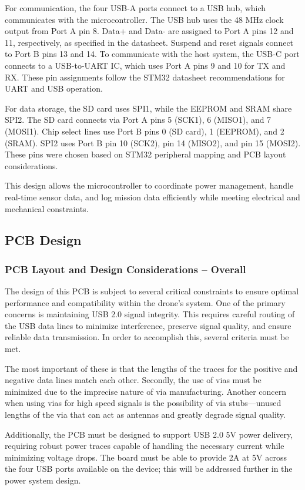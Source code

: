 \documentclass[12pt]{article}
\begin{document}
For communication, the four USB-A ports connect to a USB hub, which communicates with the microcontroller. The USB hub uses the 48 MHz clock output from Port A pin 8. Data+ and Data- are assigned to Port A pins 12 and 11, respectively, as specified in the datasheet. Suspend and reset signals connect to Port B pins 13 and 14. To communicate with the host system, the USB-C port connects to a USB-to-UART IC, which uses Port A pins 9 and 10 for TX and RX. These pin assignments follow the STM32 datasheet recommendations for UART and USB operation.

For data storage, the SD card uses SPI1, while the EEPROM and SRAM share SPI2. The SD card connects via Port A pins 5 (SCK1), 6 (MISO1), and 7 (MOSI1). Chip select lines use Port B pins 0 (SD card), 1 (EEPROM), and 2 (SRAM). SPI2 uses Port B pin 10 (SCK2), pin 14 (MISO2), and pin 15 (MOSI2). These pins were chosen based on STM32 peripheral mapping and PCB layout considerations.

This design allows the microcontroller to coordinate power management, handle real-time sensor data, and log mission data efficiently while meeting electrical and mechanical constraints.
\subsection{PCB Design}
\subsubsection{PCB Layout and Design Considerations – Overall}
The design of this PCB is subject to several critical constraints to ensure optimal performance and compatibility within the drone’s system. One of the primary concerns is maintaining USB 2.0 signal integrity. This requires careful routing of the USB data lines to minimize interference, preserve signal quality, and ensure reliable data transmission. In order to accomplish this, several criteria must be met. 

\par The most important of these is that the lengths of the traces for the positive and negative data lines match each other. Secondly, the use of vias must be minimized due to the imprecise nature of via manufacturing. Another concern when using vias for high speed signals is the possibility of via stubs—unused lengths of the via that can act as antennas and greatly degrade signal quality.

\par Additionally, the PCB must be designed to support USB 2.0 5V power delivery, requiring robust power traces capable of handling the necessary current while minimizing voltage drops. The board must be able to provide 2A at 5V across the four USB ports available on the device; this will be addressed further in the power system design.
\end{document}
